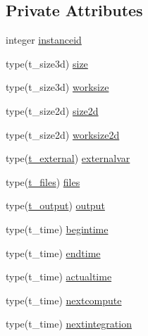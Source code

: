 \subsection*{Private Attributes}
\begin{DoxyCompactItemize}
\item 
integer \mbox{\hyperlink{structmodulevegetation_1_1t__vegetation_a9dcf2ff1a88534ccacb5444ce3731d90}{instanceid}}
\item 
type(t\+\_\+size3d) \mbox{\hyperlink{structmodulevegetation_1_1t__vegetation_abcdc09eed57e258ece1f8d840f8db2ef}{size}}
\item 
type(t\+\_\+size3d) \mbox{\hyperlink{structmodulevegetation_1_1t__vegetation_a2e950fa90ef66486d60a72d79c464ca9}{worksize}}
\item 
type(t\+\_\+size2d) \mbox{\hyperlink{structmodulevegetation_1_1t__vegetation_af80d110b995b7e41edbfbc345b2648d6}{size2d}}
\item 
type(t\+\_\+size2d) \mbox{\hyperlink{structmodulevegetation_1_1t__vegetation_a63ae6bf45024bf2286316f73c563b260}{worksize2d}}
\item 
type(\mbox{\hyperlink{structmodulevegetation_1_1t__external}{t\+\_\+external}}) \mbox{\hyperlink{structmodulevegetation_1_1t__vegetation_ae18928f5f2524a2f29dbb0666392d8e2}{externalvar}}
\item 
type(\mbox{\hyperlink{structmodulevegetation_1_1t__files}{t\+\_\+files}}) \mbox{\hyperlink{structmodulevegetation_1_1t__vegetation_a369648a369a8e4696dbf3290466819fa}{files}}
\item 
type(\mbox{\hyperlink{structmodulevegetation_1_1t__output}{t\+\_\+output}}) \mbox{\hyperlink{structmodulevegetation_1_1t__vegetation_aa4c4f6fa2b485a88d6e7187252e04d6b}{output}}
\item 
type(t\+\_\+time) \mbox{\hyperlink{structmodulevegetation_1_1t__vegetation_a89cb2e1dc28bc22ea7e05f40d10bfb9f}{begintime}}
\item 
type(t\+\_\+time) \mbox{\hyperlink{structmodulevegetation_1_1t__vegetation_a076f8616dff511fe83524297e475f295}{endtime}}
\item 
type(t\+\_\+time) \mbox{\hyperlink{structmodulevegetation_1_1t__vegetation_afd148b5f3caf28d94bfa46f0167885ab}{actualtime}}
\item 
type(t\+\_\+time) \mbox{\hyperlink{structmodulevegetation_1_1t__vegetation_aff332702aa400832ef321cbf1c7d520b}{nextcompute}}
\item 
type(t\+\_\+time) \mbox{\hyperlink{structmodulevegetation_1_1t__vegetation_a858f9a6a653e5b91b3b215f57cc8b5e1}{nextintegration}}

\end{DoxyCompactItemize}
